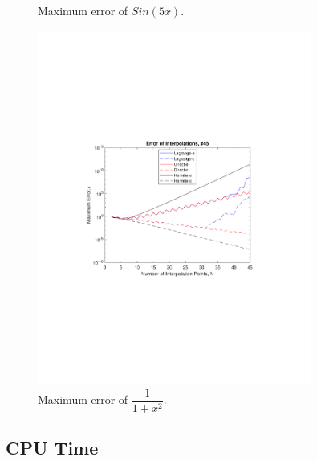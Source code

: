 \documentclass[11pt]{article}%
\begin{document}
\begin{figure}[h]
\vspace{-110pt} %
\caption{Maximum error of $Sin(5x)$.}
\vspace{-80pt} %
\includegraphics[width=9cm]{maxError3_45}%
\vspace{-110pt} %
\caption{Maximum error of $\dfrac{1}{1+x^2}$.}
\end{figure}

\clearpage
\newpage
\subsection{CPU Time}
\end{document}
